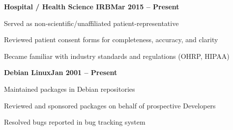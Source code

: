\documentclass[letterpaper,10pt]{article}
\newcommand{\heading}[2]{
  \hspace{10pt}#1\hfill#2\\
}
\newcommand{\headingBf}[2]{
  \heading{\textbf{#1}}{\textbf{#2}}
}
\newenvironment{resume_list}{
  \vspace{-7pt}
  \begin{itemize}[itemsep=-2px, parsep=1pt, leftmargin=30pt]
}{
  \end{itemize}
}
\begin{document}
  \headingBf{Hospital / Health Science IRB}{Mar 2015 -- Present}
  \begin{resume_list}
    \item Served as non-scientific/unaffiliated patient-representative
    \item Reviewed patient consent forms for completeness, accuracy, and clarity
    \item Became familiar with industry standards and regulations (OHRP, HIPAA)
  \end{resume_list}

  \headingBf{Debian Linux}{Jan 2001 -- Present}
  \begin{resume_list}
    \item Maintained packages in Debian repositories
    \item Reviewed and sponsored packages on behalf of prospective Developers
    \item Resolved bugs reported in bug tracking system
  \end{resume_list}
\end{document}
